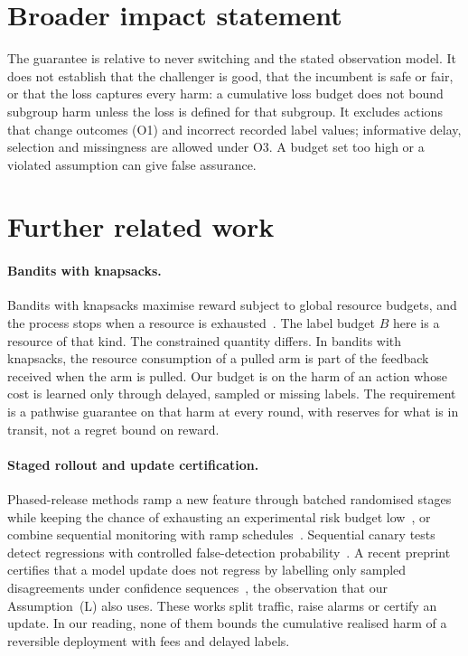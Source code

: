 \documentclass[10pt]{article}
\theoremstyle{plain}
\theoremstyle{definition}
\begin{document}
\section*{Broader impact statement}
The guarantee is relative to never switching and the stated observation model. It does not establish that the challenger is good, that the incumbent is safe or fair, or that the loss captures every harm: a cumulative loss budget does not bound subgroup harm unless the loss is defined for that subgroup. It excludes actions that change outcomes (O1) and incorrect recorded label values; informative delay, selection and missingness are allowed under O3. A budget set too high or a violated assumption can give false assurance.




\appendix
\section{Further related work}\label{app:relwork}
\paragraph{Bandits with knapsacks.}
Bandits with knapsacks maximise reward subject to global resource budgets, and the process stops when a resource is exhausted~\citep{badanidiyuru2013bandits,badanidiyuru2018bandits}. The label budget $B$ here is a resource of that kind. The constrained quantity differs. In bandits with knapsacks, the resource consumption of a pulled arm is part of the feedback received when the arm is pulled. Our budget is on the harm of an action whose cost is learned only through delayed, sampled or missing labels. The requirement is a pathwise guarantee on that harm at every round, with reserves for what is in transit, not a regret bound on reward.

\paragraph{Staged rollout and update certification.}
Phased-release methods ramp a new feature through batched randomised stages while keeping the chance of exhausting an experimental risk budget low~\citep{li2023phased}, or combine sequential monitoring with ramp schedules~\citep{zhao2019staged}. Sequential canary tests detect regressions with controlled false-detection probability~\citep{lindon2022canary}. A recent preprint certifies that a model update does not regress by labelling only sampled disagreements under confidence sequences~\citep{balachandran2026disagreement}, the observation that our Assumption~(L) also uses. These works split traffic, raise alarms or certify an update. In our reading, none of them bounds the cumulative realised harm of a reversible deployment with fees and delayed labels.
\end{document}
